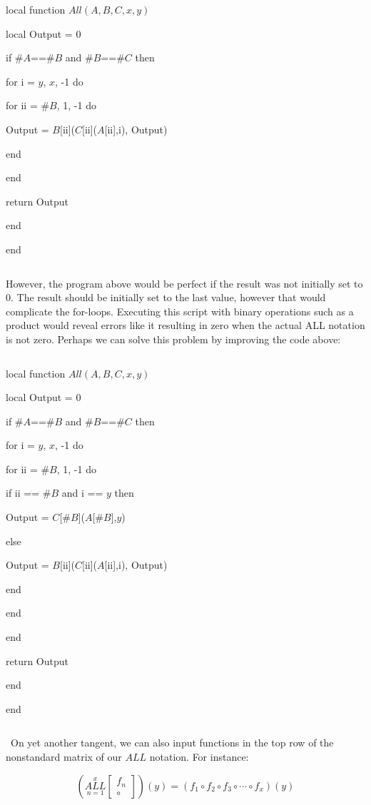 \documentclass{article}
\begin{document}
local function $All(A, B, C, x, y)$

local Output = 0

if $\#A$==$\#B$ and $\#B$==$\#C$ then

for i = $y$, $x$, -1 do

for ii = $\#B$, 1, -1 do

Output = $B$[ii]($C$[ii]($A$[ii],i), Output)

end

end

return Output

end

end

$${}$$

However, the program above would be perfect if the result was not initially set to 0. The result should be initially set to the last value, however that would complicate the for-loops. Executing this script with binary operations such as a product would reveal errors like it resulting in zero when the actual ALL notation is not zero. Perhaps we can solve this problem by improving the code above:

$${}$$

local function $All(A, B, C, x, y)$

local Output = 0

if $\#A$==$\#B$ and $\#B$==$\#C$ then

for i = $y$, $x$, -1 do

for ii = $\#B$, 1, -1 do

if ii == $\#B$ and i == $y$ then

Output = $C$[$\#B$]($A$[$\#B$],$y$)

else

Output = $B$[ii]($C$[ii]($A$[ii],i), Output)

end

end

end

return Output

end

end

$${}$$

 On yet another tangent, we can also input functions in the top row of the nonstandard matrix of our $ALL$ notation. For instance:

$$(\underset{n=1}{\overset{x}{ALL}} \begin{bmatrix}
f_n \\
\circ
\end{bmatrix}) (y) = (f_1 \circ f_2 \circ f_3 \circ \cdots \circ f_x)(y)$$
\end{document}

